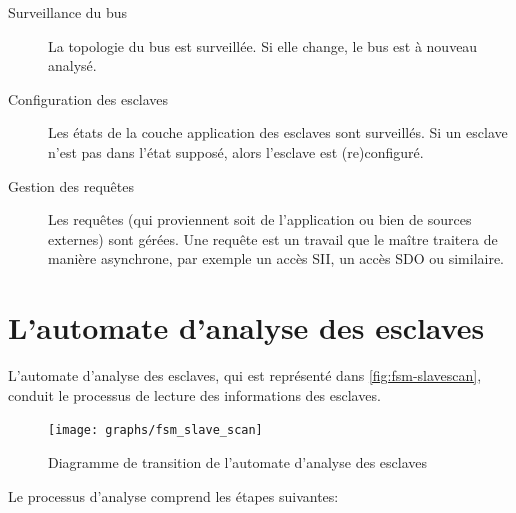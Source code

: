 \documentclass[a4paper,12pt,BCOR=6mm,bibtotoc,idxtotoc]{scrbook}
\begin{document}
\begin{description}

\item[Surveillance du bus] La topologie du bus est surveill\'ee. Si elle
  change, le bus est \`a nouveau analys\'e.

\item[Configuration des esclaves] Les \'etats de la couche application
  des esclaves sont surveill\'es. Si un esclave n'est pas dans l'\'etat
  suppos\'e, alors l'esclave est (re)configur\'e.

\item[Gestion des requ\^etes] Les requ\^etes (qui proviennent soit de
  l'application ou bien de sources externes) sont g\'er\'ees.  Une requ\^ete
  est un travail que le ma\^itre traitera de mani\`ere asynchrone, par
  exemple un acc\`es SII, un acc\`es SDO ou similaire.

\end{description}


\section{L'automate d'analyse des esclaves}
\label{sec:fsm-scan}

L'automate d'analyse des esclaves, qui est repr\'esent\'e dans
\autoref{fig:fsm-slavescan}, conduit le processus de lecture des
informations des esclaves.

\begin{figure}[htbp]
  \centering
  \texttt{[image: graphs/fsm\_slave\_scan]}
  \caption{Diagramme de transition de l'automate d'analyse des esclaves}
  \label{fig:fsm-slavescan}
\end{figure}

Le processus d'analyse comprend les \'etapes suivantes:
\end{document}
